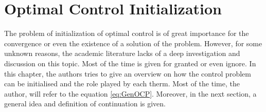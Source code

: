 \chapter{Optimal Control Initialization}
\label{Ch:OCIni}
%
The problem of initialization of optimal control is of great importance for the convergence or even the existence of a solution of the problem. However, for some unknown reasons, the academic literature lacks of a deep investigation and discussion on this topic. Most of the time is given for granted or even ignore. In this chapter, the authors tries to give an overview on how the control problem can be initialised and the role played by each therm. Most of the time, the author, will refer to the equation \ref{eq:GenOCP}. Moreover, in the next section, a general idea and definition of continuation is given.
%






%